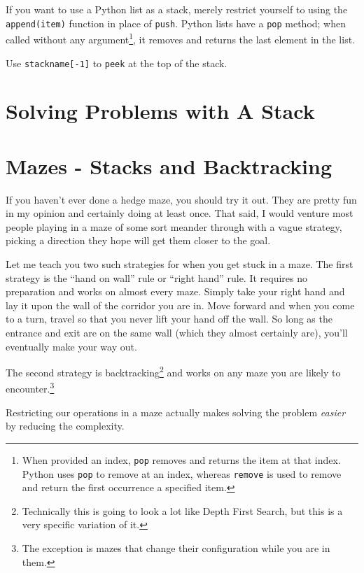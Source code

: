 If you want to use a Python list as a stack, merely restrict yourself to using the \texttt{append(item)} function in place of \texttt{push}.  Python lists have a \texttt{pop} method;  when called without any argument\footnote{When provided an index, \texttt{pop} removes and returns the item at that index.  Python uses \texttt{pop} to remove at an index, whereas \texttt{remove} is used to remove and return the first occurrence a specified item.},  it removes and returns the last element in the list.

Use \texttt{stackname[-1]} to \texttt{peek} at the top of the stack.




\section{Solving Problems with A Stack}


\section{Mazes - Stacks and Backtracking}

If you haven't ever done a hedge maze, you should try it out.  They are pretty fun in my opinion and certainly doing at least once.  That said, I would venture most people playing in a maze of some sort meander through with a vague strategy, picking a direction they hope will get them closer to the goal.

Let me teach you two such strategies for when you get stuck in a maze.  The first strategy is the ``hand on wall'' rule or ``right hand'' rule.  It requires no preparation and works on almost every maze.  Simply take your right hand and lay it upon the wall of the corridor you are in.  Move forward and when you come to a turn, travel so that you never lift your hand off the wall.  So long as the entrance and exit are on the same wall (which they almost certainly are), you'll eventually make your way out.

The second strategy is backtracking\footnote{Technically this is going to look a lot like Depth First Search, but this is a very specific variation of it.} and works on any maze you are likely to encounter.\footnote{The exception is mazes that change their configuration while you are in them.}





Restricting our operations in a maze actually makes solving the problem \textit{easier} by reducing the complexity.

